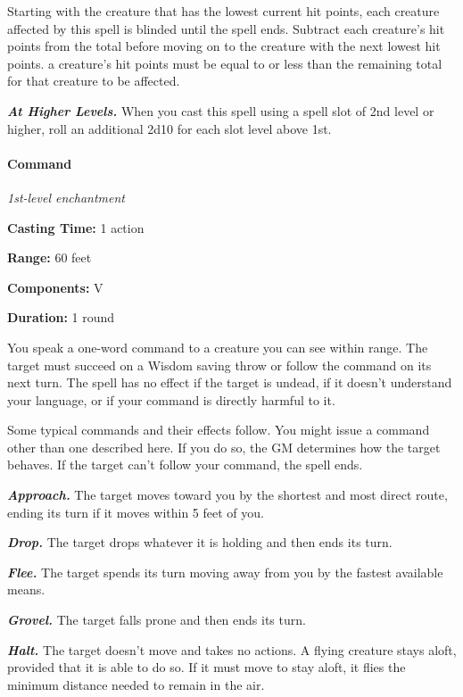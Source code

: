\documentclass[
]{article}
\begin{document}
Starting with the creature that has the lowest current hit points, each
creature affected by this spell is blinded until the spell ends.
Subtract each creature's hit points from the total before moving on to
the creature with the next lowest hit points. a creature's hit points
must be equal to or less than the remaining total for that creature to
be affected.

\emph{\textbf{At Higher Levels.}} When you cast this spell using a spell
slot of 2nd level or higher, roll an additional 2d10 for each slot level
above 1st.

\hypertarget{command}{%
\paragraph{Command}\label{command}}

\emph{1st-level enchantment}

\textbf{Casting Time:} 1 action

\textbf{Range:} 60 feet

\textbf{Components:} V

\textbf{Duration:} 1 round

You speak a one-word command to a creature you can see within range. The
target must succeed on a Wisdom saving throw or follow the command on
its next turn. The spell has no effect if the target is undead, if it
doesn't understand your language, or if your command is directly harmful
to it.

Some typical commands and their effects follow. You might issue a
command other than one described here. If you do so, the GM determines
how the target behaves. If the target can't follow your command, the
spell ends.

\emph{\textbf{Approach.}} The target moves toward you by the shortest
and most direct route, ending its turn if it moves within 5 feet of you.

\emph{\textbf{Drop.}} The target drops whatever it is holding and then
ends its turn.

\emph{\textbf{Flee.}} The target spends its turn moving away from you by
the fastest available means.

\emph{\textbf{Grovel.}} The target falls prone and then ends its turn.

\emph{\textbf{Halt.}} The target doesn't move and takes no actions. A
flying creature stays aloft, provided that it is able to do so. If it
must move to stay aloft, it flies the minimum distance needed to remain
in the air.
\end{document}
